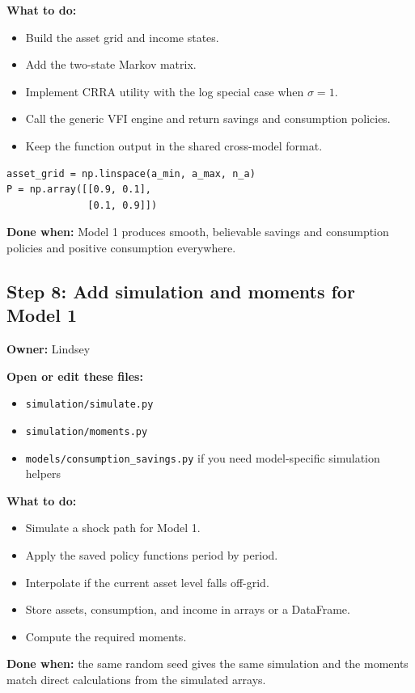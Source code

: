 \documentclass[11pt]{article}
\begin{document}
\textbf{What to do:}
\begin{itemize}
    \item Build the asset grid and income states.
    \item Add the two-state Markov matrix.
    \item Implement CRRA utility with the log special case when \(\sigma=1\).
    \item Call the generic VFI engine and return savings and consumption policies.
    \item Keep the function output in the shared cross-model format.
\end{itemize}

\begin{lstlisting}
asset_grid = np.linspace(a_min, a_max, n_a)
P = np.array([[0.9, 0.1],
              [0.1, 0.9]])
\end{lstlisting}

\textbf{Done when:} Model 1 produces smooth, believable savings and consumption policies and positive consumption everywhere.

\subsection{Step 8: Add simulation and moments for Model 1}
\textbf{Owner:} Lindsey

\textbf{Open or edit these files:}
\begin{itemize}
    \item \texttt{simulation/simulate.py}
    \item \texttt{simulation/moments.py}
    \item \texttt{models/consumption\_savings.py} if you need model-specific simulation helpers
\end{itemize}

\textbf{What to do:}
\begin{itemize}
    \item Simulate a shock path for Model 1.
    \item Apply the saved policy functions period by period.
    \item Interpolate if the current asset level falls off-grid.
    \item Store assets, consumption, and income in arrays or a DataFrame.
    \item Compute the required moments.
\end{itemize}

\textbf{Done when:} the same random seed gives the same simulation and the moments match direct calculations from the simulated arrays.
\end{document}
